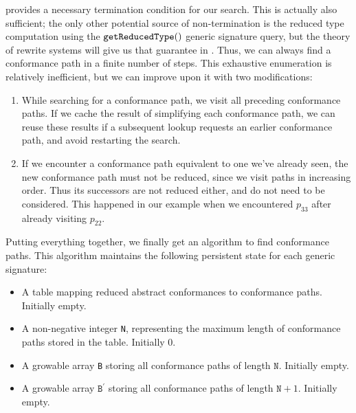 \documentclass[../generics]{subfiles}
\begin{document}
 provides a necessary termination condition for our search. This is actually also sufficient; the only other potential source of non-termination is the reduced type computation using the $\texttt{getReducedType}()$ generic signature query, but the theory of rewrite systems will give us that guarantee in . Thus, we can always find a conformance path in a finite number of steps. This exhaustive enumeration is relatively inefficient, but we can improve upon it with two modifications:
\begin{enumerate}
\item While searching for a conformance path, we visit all preceding conformance paths. If we cache the result of simplifying each conformance path, we can reuse these results if a subsequent lookup requests an earlier conformance path, and avoid restarting the search.
\item If we encounter a conformance path equivalent to one we've already seen, the new conformance path must not be reduced, since we visit paths in increasing order. Thus its successors are not reduced either, and do not need to be considered. This happened in our example when we encountered $p_{33}$ after already visiting $p_{22}$.
\end{enumerate}
Putting everything together, we finally get an algorithm to find conformance paths. This algorithm maintains the following persistent state for each generic signature:
\begin{itemize}
\item A table mapping reduced abstract conformances to conformance paths. Initially empty.
\item A non-negative integer \texttt{N}, representing the maximum length of conformance paths stored in the table. Initially 0.
\item A growable array \texttt{B} storing all conformance paths of length $\texttt{N}$. Initially empty.
\item A growable array $\texttt{B}^\prime$ storing all conformance paths of length $\texttt{N}+1$. Initially empty.
\end{itemize}
\end{document}
